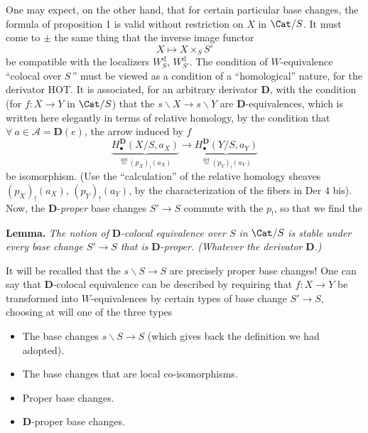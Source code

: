 One may expect, on the other hand, that for certain particular base changes, the formula of proposition 1 is valid without restriction on $X$ in $\Cat/S$. It must come to $\pm$ the same thing that the inverse image functor
\[
X \longmapsto X \times_S S'
\]
be compatible with the localizers $W_S^{\mathrm{d}}$, $W_{S'}^{\mathrm{d}}$. The condition of $W$-equivalence ``colocal over $S$\,'' must be viewed as a condition of a ``homological'' nature, for the derivator HOT. It is associated, for an arbitrary derivator $\mathbf{D}$, with the condition (for $f : X \longrightarrow Y$ in $\Cat/S$) that the $s\backslash X \longrightarrow s\backslash Y$ are $\mathbf{D}$-equivalences,
which is written here elegantly in terms of relative homology, by the condition that $\forall\ a \in \mathcal{A} = \mathbf{D}(e)$, the arrow induced by $f$ %
\[
\underbrace{H_\bullet^{\mathbf{D}}(X/S, a_X)}_{\overset{\text{def}}{=}(p_X)_!(a_X)} \longrightarrow \underbrace{H_\bullet^{\mathbf{D}}(Y/S, a_Y)}_{\overset{\text{def}}{=}(p_Y)_!(a_Y)}
\]
be isomorphism. (Use the ``calculation'' of the relative homology sheaves $(p_X)_!(a_X)$, $(p_Y)_!(a_Y)$, by the characterization of the fibers in Der 4 bis). Now, the $\mathbf{D}$-\textit{proper} base changes $S' \longrightarrow S$ commute with the $p_!$, so that we find the

\textbf{Lemma.} \textit{The notion of} $\mathbf{D}$\textit{-colocal equivalence over $S$ in} $\Cat/S$ \textit{is stable under every base change $S' \longrightarrow S$ that is} $\mathbf{D}$\textit{-proper. (Whatever the derivator} $\mathbf{D}$\textit{.)}

It will be recalled that the $s\backslash S \longrightarrow S$ are precisely proper base changes! One %
can say that $\mathbf{D}$-colocal equivalence can be described by requiring that $f : X \longrightarrow Y$ be transformed into $W$-equivalences by certain types of base change $S' \longrightarrow S$, choosing at will one of the three types

\begin{itemize}
\item[a)] The base changes $s\backslash S \longrightarrow S$ (which gives back the definition we had adopted).
\item[b)] The base changes that are local co-isomorphisms.
\item[c)] Proper base changes.
\item[d)] $\mathbf{D}$-proper base changes.
\end{itemize}

